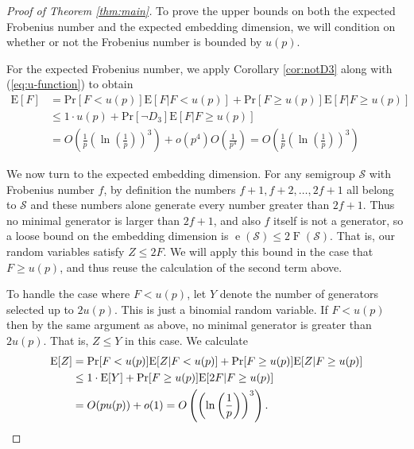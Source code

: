 \documentclass[11pt]{amsart}
\theoremstyle{definition}
\theoremstyle{remark}
\def\Pr{\ensuremath{\mathrm{Pr}}}
\def\EE{\ensuremath{\mathrm{E}}}
\def\nsg{\ensuremath{\mathcal{S}}}
\DeclareMathOperator\F{F}
\DeclareMathOperator\e{e}
\begin{document}
  \begin{proof}[Proof of Theorem \ref{thm:main}] To prove the upper bounds on both the expected Frobenius number and the expected embedding dimension, we will condition on whether or not the Frobenius number is bounded by $u(p)$.

    For the expected Frobenius number, we apply Corollary \ref{cor:notD3} along with (\ref{eq:u-function}) to obtain
\begin{align*}
  \EE[F] & = \Pr[F < u(p)]\EE[F | F < u(p)] + \Pr[F \geq u(p)]\EE[F | F \geq u(p)] \\
  & \leq 1 \cdot u(p) + \Pr[\lnot D_3] \EE[F | F \geq u(p)] \\
  & = O\left(\frac{1}{p} \left( \ln \left(\frac{1}{p}\right)\right)^3 \right) + o \left(p^4\right)O\left(\frac{1}{p^4}\right) = O\left(\frac{1}{p} \left( \ln \left(\frac{1}{p}\right)\right)^3 \right)
\end{align*}

We now turn to the expected embedding dimension. For any semigroup $\nsg$ with Frobenius number $f$, by definition the numbers $f+1, f+2, \dots, 2f+1$ all belong to $\nsg$ and these numbers alone generate every number greater than $2f+1$. Thus no minimal generator is larger than $2f+1$, and also $f$ itself is not a generator, so a loose bound on the embedding dimension is $\e(\nsg) \leq 2\F(\nsg)$. That is, our random variables satisfy $Z \leq 2F$. We will apply this bound in the case that $F \geq u(p)$, and thus reuse the calculation of the second term above. 

To handle the case where $F < u(p)$, let $Y$ denote the number of generators selected up to $2u(p)$. This is just a binomial random variable. If $F < u(p)$ then by the same argument as above, no minimal generator is greater than $2u(p)$. That is, $Z \leq Y$ in this case. We calculate
\begin{align*} \EE[Z] & = \Pr[F < u(p)]\EE[Z | F < u(p)] + \Pr[F \geq u(p)]\EE[Z | F \geq u(p)] \\
  & \leq 1 \cdot \EE[Y] +  \Pr[F \geq u(p)]\EE[2F | F \geq u(p)] \\
  & = O(pu(p)) + o(1) = O\left(\left( \ln \left(\frac{1}{p}\right)\right)^3 \right).\qedhere
\end{align*}
\end{proof}

\end{document}
